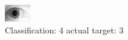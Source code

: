 \begin{figure}[h!]
\begin{center}
\includegraphics[width=0.60\columnwidth]{figures/ID1865_class_4_target_3.png}
\end{center}
\caption{ Classification: 4 actual target: 3}
\label{fig:ID1865_class_4_target_3}
\end{figure}
